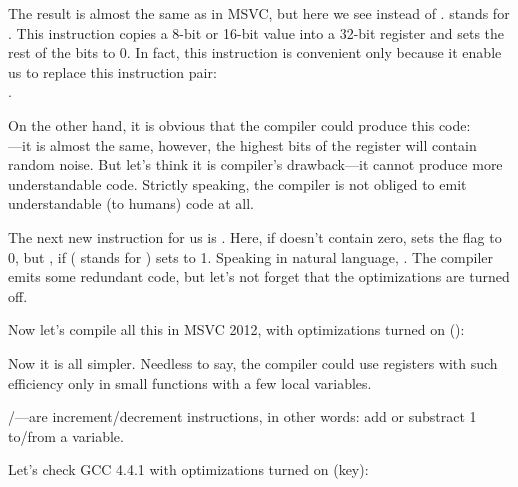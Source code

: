 \label{movzx}

The result is almost the same as in MSVC, but here we see \MOVZX instead of \MOVSX. 
\MOVZX stands for . 
This instruction copies a 8-bit or 16-bit value into a 32-bit register and sets the rest of the bits to 0. 
In fact, this instruction is convenient only because it enable us to replace this instruction pair:\\
.

On the other hand, it is obvious that the compiler could produce this code: \\
---it is almost the same, however, 
the highest bits of the \EAX register will contain random noise. 
But let's think it is compiler's drawback---it cannot produce more understandable code. 
Strictly speaking, the compiler is not obliged to emit understandable (to humans) code at all.


The next new instruction for us is \SETNZ. 
Here, if \AL doesn't contain zero,  
sets the \ZF flag to 0, but \SETNZ, if  ( stands for ) sets \AL to 1.
Speaking in natural language, . 
The compiler emits some redundant code, but let's not forget that the optimizations are turned off.

\label{strlen_MSVC_Ox}

Now let's compile all this in MSVC 2012, with optimizations turned on (\Ox):



Now it is all simpler.
Needless to say, the compiler could use registers with such efficiency
only in small functions with a few local variables.

\INC/\DEC---are \gls{increment}/\gls{decrement} instructions, in other words: add or substract 1 to/from a variable.




Let's check GCC 4.4.1 with optimizations turned on (\Othree key):


 
